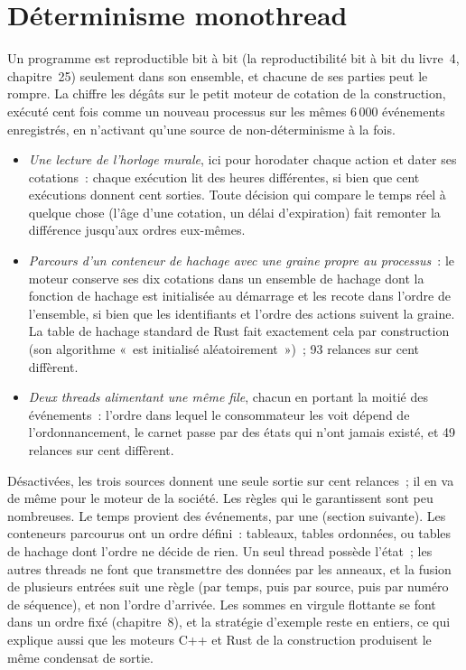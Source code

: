 \section{Déterminisme monothread}

Un programme est reproductible bit à bit (la reproductibilité bit à bit du livre~4, chapitre~25) seulement dans son ensemble, et chacune
de ses parties peut le rompre. La  chiffre les dégâts sur le petit moteur de cotation de la construction, exécuté cent fois comme un nouveau
processus sur les mêmes 6\,000 événements enregistrés, en n'activant qu'une source de non-déterminisme à la fois.

\begin{itemize}
\item \emph{Une lecture de l'horloge murale}, ici pour horodater chaque action et dater ses cotations~: chaque exécution lit des heures différentes, si bien que
cent exécutions donnent cent sorties. Toute décision qui compare le temps réel à quelque chose (l'âge d'une cotation, un délai d'expiration) fait
remonter la différence jusqu'aux ordres eux-mêmes.
\item \emph{Parcours d'un conteneur de hachage avec une graine propre au processus}~: le moteur conserve ses dix cotations dans un ensemble de hachage dont la fonction de hachage
est initialisée au démarrage et les recote dans l'ordre de l'ensemble, si bien que les identifiants et l'ordre des actions suivent la graine.
La table de hachage standard de Rust fait exactement cela par construction (son algorithme «~est initialisé aléatoirement~»)~; 93 relances sur cent
diffèrent.
\item \emph{Deux threads alimentant une même file}, chacun en portant la moitié des événements~: l'ordre dans lequel le consommateur les voit dépend
de l'ordonnancement, le carnet passe par des états qui n'ont jamais existé, et 49 relances sur cent diffèrent.
\end{itemize}

Désactivées, les trois sources donnent une seule sortie sur cent relances~; il en va de même pour le moteur de la société. Les règles qui le garantissent sont peu nombreuses. Le temps
provient des événements, par une  (section suivante). Les conteneurs parcourus ont un ordre défini~: tableaux,
tables ordonnées, ou tables de hachage dont l'ordre ne décide de rien. Un seul thread possède l'état~; les autres threads ne font que transmettre des données
par les anneaux, et la fusion de plusieurs entrées suit une règle (par temps, puis par source, puis par numéro de séquence), et non l'ordre
d'arrivée. Les sommes en virgule flottante se font dans un ordre fixé (chapitre~8), et la stratégie d'exemple reste en entiers, ce qui explique aussi que
les moteurs C++ et Rust de la construction produisent le même condensat de sortie.

